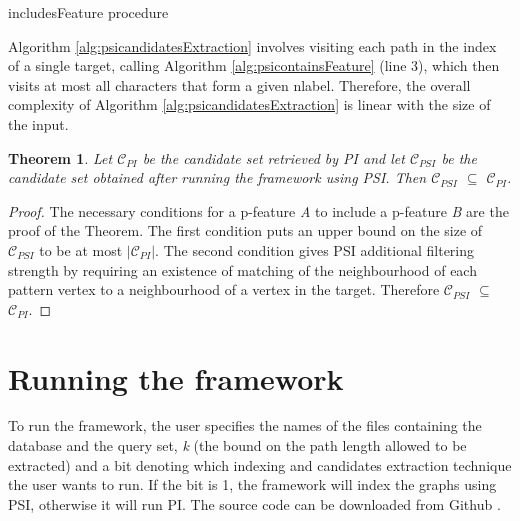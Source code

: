 \documentclass{l4proj}
\newtheorem{theorem}{Theorem}[section]
\newcommand{\fancyC}{\mathcal{C}}
\begin{document}
\begin{algorithm}
\centering
\caption{includesFeature procedure}
\label{alg:psicontainsFeature}
\begin{algorithmic}[1]
  
\EndIf
{} 
\EndIf
{} 
    \EndIf
\EndFor
{}
\EndProcedure
\end{algorithmic}
\end{algorithm}

Algorithm \ref{alg:psicandidatesExtraction} involves visiting each path in the index of a single target, calling Algorithm \ref{alg:psicontainsFeature} (line 3), which then visits at most all characters that form a given nlabel. Therefore, the overall complexity of Algorithm \ref{alg:psicandidatesExtraction} is linear with the size of the input.

\begin{theorem}
\label{psiisbettertheorem}
Let $\fancyC_{PI}$ be the candidate set retrieved by PI and let $\fancyC_{PSI}$ be the candidate set obtained after running the framework using PSI. Then $\fancyC_{PSI}$ $\subseteq$ $\fancyC_{PI}$.
\end{theorem}

\begin{proof}
The necessary conditions for a p-feature \emph{A} to include a p-feature \emph{B} are the proof of the Theorem. The first condition puts an upper bound on the size of $\fancyC_{PSI}$ to be at most $|\fancyC_{PI}|$. The second condition gives PSI additional filtering strength by requiring an existence of matching of the neighbourhood of each pattern vertex to a neighbourhood of a vertex in the target. Therefore $\fancyC_{PSI}$ $\subseteq$ $\fancyC_{PI}$. 
\end{proof}

\section{Running the framework}
To run the framework, the user specifies the names of the files containing the database and the query set, \emph{k} (the bound on the path length allowed to be extracted) and a bit denoting which indexing and candidates extraction technique the user wants to run. If the bit is 1, the framework will index the graphs using PSI, otherwise it will run PI. The source code can be downloaded from Github \cite{framework-github}.
\end{document}

